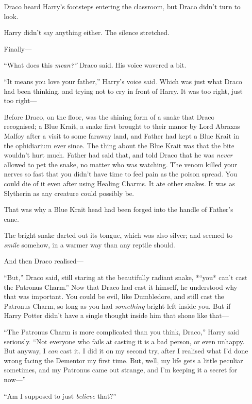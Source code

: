 Draco heard Harry's footsteps entering the classroom, but Draco didn't
turn to look.

Harry didn't say anything either. The silence stretched.

Finally---

``What does this \emph{mean?''} Draco said. His voice wavered a bit.

``It means you love your father,'' Harry's voice said. Which was just
what Draco had been thinking, and trying not to cry in front of Harry.
It was too right, just too right---

Before Draco, on the floor, was the shining form of a snake that Draco
recognised; a Blue Krait, a snake first brought to their manor by Lord
Abraxas Malfoy after a visit to some faraway land, and Father had kept a
Blue Krait in the ophidiarium ever since. The thing about the Blue Krait
was that the bite wouldn't hurt much. Father had said that, and told
Draco that he was \emph{never} allowed to pet the snake, no matter who
was watching. The venom killed your nerves so fast that you didn't have
time to feel pain as the poison spread. You could die of it even after
using Healing Charms. It ate other snakes. It was as Slytherin as any
creature could possibly be.

That was why a Blue Krait head had been forged into the handle of
Father's cane.

The bright snake darted out its tongue, which was also silver; and
seemed to \emph{smile} somehow, in a warmer way than any reptile should.

And then Draco realised---

``But,'' Draco said, still staring at the beautifully radiant snake,
*``you* can't cast the Patronus Charm.'' Now that Draco had cast it
himself, he understood why that was important. You could be evil, like
Dumbledore, and still cast the Patronus Charm, so long as you had
\emph{something} bright left inside you. But if Harry Potter didn't have
a single thought inside him that shone like that---

``The Patronus Charm is more complicated than you think, Draco,'' Harry
said seriously. ``Not everyone who fails at casting it is a bad person,
or even unhappy. But anyway, I \emph{can} cast it. I did it on my second
try, after I realised what I'd done wrong facing the Dementor my first
time. But, well, my life gets a little peculiar sometimes, and my
Patronus came out strange, and I'm keeping it a secret for now---''

``Am I supposed to just \emph{believe} that?''

